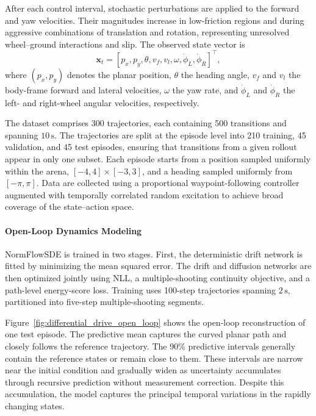 After each control interval, stochastic perturbations are applied to the forward and yaw velocities. Their magnitudes increase in low-friction regions and during aggressive combinations of translation and rotation, representing unresolved wheel--ground interactions and slip. The observed state vector is
\begin{equation}
    \boldsymbol{x}_t=[p_x,p_y,\theta, v_f,v_l,\omega,\dot\phi_L,\dot\phi_R]^\top,
\end{equation}
where $(p_x,p_y)$ denotes the planar position, $\theta$ the heading angle, $v_f$ and $v_l$ the body-frame forward and lateral velocities, $\omega$ the yaw rate, and $\dot\phi_L$ and $\dot\phi_R$ the left- and right-wheel angular velocities, respectively.

The dataset comprises 300 trajectories, each containing 500 transitions and spanning $10\,\mathrm{s}$. The trajectories are split at the episode level into 210 training, 45 validation, and 45 test episodes, ensuring that transitions from a given rollout appear in only one subset. Each episode starts from a position sampled uniformly within the arena, $[-4,4]\times[-3,3]$, and a heading sampled uniformly from $[-\pi,\pi]$. Data are collected using a proportional waypoint-following controller augmented with temporally correlated random excitation to achieve broad coverage of the state--action space.

\paragraph{Open-Loop Dynamics Modeling}
NormFlowSDE is trained in two stages. First, the deterministic drift network is fitted by minimizing the mean squared error. The drift and diffusion networks are then optimized jointly using \ac{NLL}, a multiple-shooting continuity objective, and a path-level energy-score loss. Training uses 100-step trajectories spanning $2\,\mathrm{s}$, partitioned into five-step multiple-shooting segments.

Figure~\ref{fig:differential_drive_open_loop} shows the open-loop reconstruction of one test episode. The predictive mean captures the curved planar path and closely follows the reference trajectory. The 90\% predictive intervals generally contain the reference states or remain close to them. These intervals are narrow near the initial condition and gradually widen as uncertainty accumulates through recursive prediction without measurement correction. Despite this accumulation, the model captures the principal temporal variations in the rapidly changing states.

